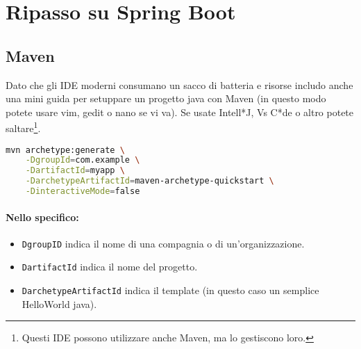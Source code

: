 \section{Ripasso su Spring Boot}


\subsection{Maven}

Dato che gli IDE moderni consumano un sacco di batteria e risorse includo anche una mini guida per setuppare un progetto java con Maven (in questo modo potete usare vim, gedit o nano se vi va). Se usate Intell*J, Vs C*de o altro potete saltare\footnote{Questi IDE possono utilizzare anche Maven, ma lo gestiscono loro.}.




\begin{lstlisting}[language=bash, caption={Creazione di un progetto Maven}]
mvn archetype:generate \
    -DgroupId=com.example \
    -DartifactId=myapp \
    -DarchetypeArtifactId=maven-archetype-quickstart \
    -DinteractiveMode=false
\end{lstlisting}

\paragraph{Nello specifico:}

\begin{itemize}
  \item \texttt{DgroupID} indica il nome di una compagnia o di un'organizzazione. 
  \item \texttt{DartifactId} indica il nome del progetto. 
  \item \texttt{DarchetypeArtifactId} indica il template (in questo caso un semplice HelloWorld java).
\end{itemize}


